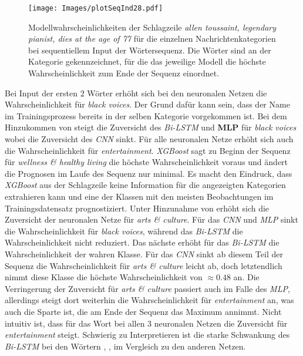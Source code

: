 \documentclass[a4paper,11pt]{article}
\begin{document}
\begin{figure}[!ht]
    \centering
\texttt{[image: Images/plotSeqInd28.pdf]} 
\caption{Modellwahrscheinlichkeiten der Schlagzeile \textit{allen toussaint, legendary pianist, dies at the age of 77} für die einzelnen Nachrichtenkategorien bei sequentiellem Input der Wörtersequenz. Die Wörter sind an der Kategorie gekennzeichnet, für die das jeweilige Modell die höchste Wahrscheinlichkeit zum Ende der Sequenz einordnet.}
\label{abb:plotSeqInd28}
\end{figure}

Bei Input der ersten $2$ Wörter  erhöht sich bei den neuronalen Netzen die Wahrscheinlichkeit für \textit{black voices}. Der Grund dafür kann sein, dass der Name im Trainingsprozess bereits in der selben Kategorie vorgekommen ist. Bei dem Hinzukommen von  steigt die Zuversicht des \textit{Bi-LSTM} und \textbf{MLP} für \textit{black voices} wobei die Zuversicht des \textit{CNN} sinkt. Für alle neuronalen Netze erhöht sich auch die Wahrscheinlichkeit für \textit{entertainment}. \textit{XGBoost} sagt zu Beginn der Sequenz für \textit{wellness \& healthy living} die höchste Wahrscheinlichkeit voraus und ändert die Prognosen im Laufe des Sequenz nur minimal. Es macht den Eindruck, dass \textit{XGBoost} aus der Schlagzeile keine Information für die angezeigten Kategorien extrahieren kann und eine der Klassen mit den meisten Beobachtungen im Trainingsdatensatz prognostiziert. Unter Hinzunahme von  erhöht sich die Zuversicht der neuronalen Netze für \textit{arts \& culture}. Für das \textit{CNN} und \textit{MLP} sinkt die Wahrscheinlichkeit für \textit{black voices}, während das \textit{Bi-LSTM} die Wahrscheinlichkeit nicht reduziert. Das nächste \say{\textit{,}} erhöht für das \textit{Bi-LSTM} die Wahrscheinlichkeit der wahren Klasse. Für das \textit{CNN} sinkt ab diesem Teil der Sequenz die Wahrscheinlichkeit für \textit{arts \& culture} leicht ab, doch letztendlich nimmt diese Klasse die höchste Wahrscheinlichkeit von $\approx 0.48$ an. Die Verringerung der Zuversicht für \textit{arts \& culture} passiert auch im Falle des \textit{MLP}, allerdings steigt dort weiterhin die Wahrscheinlichkeit für \textit{entertainment} an, was auch die Sparte ist, die am Ende der Sequenz das Maximum annimmt. Nicht intuitiv ist, dass für das Wort  bei allen $3$ neuronalen Netzen die Zuversicht für \textit{entertainment} steigt. Schwierig zu Interpretieren ist die starke Schwankung des \textit{Bi-LSTM} bei den Wörtern , ,  im Vergleich zu den anderen Netzen.
\end{document}
